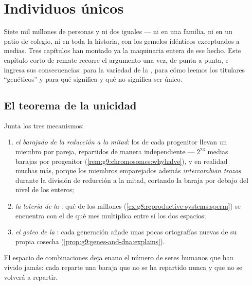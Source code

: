 \chapter{Individuos únicos}\label{ch:g9:unique-individuals}

Siete mil millones de personas y ni dos iguales --- ni en una familia,
ni en un patio de colegio, ni en toda la historia, con los gemelos
idénticos exceptuados a medias. Tres capítulos han montado ya la
maquinaria entera de ese hecho. Este capítulo corto de remate recorre
el argumento una vez, de punta a punta, e ingresa sus consecuencias:
para la variedad de la , para cómo leemos los titulares
``genéticos'' y para qué significa y qué no significa ser único.

\section{El teorema de la unicidad}

\begin{proposition}\label{prop:g9:unique-individuals:theorem}
Junta los tres mecanismos:
\begin{enumerate}
  \item \emph{el barajado de la reducción a la mitad}: los  de
        cada progenitor llevan un miembro por pareja, repartidos de
        manera independiente --- $2^{23}$ medias barajas por progenitor
        (\cref{rem:g9:chromosomes:whyhalve}), y en realidad muchas más,
        porque los miembros emparejados además \emph{intercambian
        trozos} durante la división de reducción a la mitad, cortando
        la baraja por debajo del nivel de los  enteros;
  \item \emph{la lotería de la }: qué  de los
        millones (\cref{ex:g8:reproductive-systems:sperm}) se encuentra
        con el  de qué mes multiplica entre sí los dos espacios;
  \item \emph{el goteo de la }: cada generación añade unas
        pocas ortografías nuevas de su propia cosecha
        (\cref{prop:g9:genes-and-dna:explains}).
\end{enumerate}
El espacio de combinaciones deja enano el número de seres humanos que
han vivido jamás: cada  reparte una baraja que no se ha
repartido nunca y que no se volverá a repartir.
\end{proposition}
\admitted

